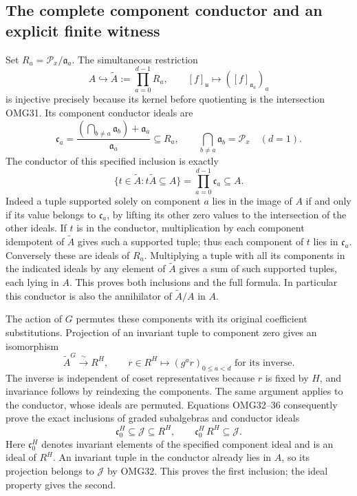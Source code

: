 \documentclass[11pt,a4paper]{article}
\begin{document}
\subsection{The complete component conductor and an explicit finite witness}
Set $R_a=\mathscr P_x/\mathfrak a_a$. The simultaneous restriction
\[
 A\hookrightarrow\widetilde A:=\prod_{a=0}^{d-1}R_a,
 \qquad[f]_{\mathfrak u}\longmapsto([f]_{\mathfrak a_a})_a
 \tag{OMG33}
\]
is injective precisely because its kernel before quotienting is the
intersection OMG31. Its component conductor ideals are
\[
 \mathfrak c_a=
 \frac{(\bigcap_{b\ne a}\mathfrak a_b)+\mathfrak a_a}{\mathfrak a_a}
       \subseteq R_a,
 \qquad\bigcap_{b\ne a}\mathfrak a_b=\mathscr P_x\quad(d=1).
 \tag{OMG34}
\]
The conductor of this specified inclusion is exactly
\[
 \boxed{\{t\in\widetilde A:t\widetilde A\subseteq A\}
                   =\prod_{a=0}^{d-1}\mathfrak c_a\subseteq A.}
 \tag{OMG35}
\]
Indeed a tuple supported solely on component $a$ lies in the image
of $A$ if and only if its value belongs to $\mathfrak c_a$, by
lifting its other zero values to the intersection of the other
ideals. If $t$ is in the conductor, multiplication by each component
idempotent of $\widetilde A$ gives such a supported tuple; thus each
component of $t$ lies in $\mathfrak c_a$. Conversely these are
ideals of $R_a$. Multiplying a tuple with all its components in
the indicated ideals by any element of $\widetilde A$ gives a sum
of such supported tuples, each lying in $A$. This proves both
inclusions and the full formula. In particular this conductor is
also the annihilator of $\widetilde A/A$ in $A$.

The action of $G$ permutes these components with its original
coefficient substitutions. Projection of an invariant tuple to
component zero gives an isomorphism
\[
 \widetilde A^G\xrightarrow{\ \sim\ }R^H,\qquad
 r\in R^H\longmapsto(g^a r)_{0\le a<d}
                       \text{ for its inverse}.
 \tag{OMG36}
\]
The inverse is independent of coset representatives because $r$
is fixed by $H$, and invariance follows by reindexing the components.
The same argument applies to the conductor, whose ideals are
permuted. Equations OMG32--36 consequently prove the exact
inclusions of graded subalgebras and conductor ideals
\[
 \boxed{\mathfrak c_0^H\subseteq\mathscr J\subseteq R^H,
            \qquad\mathfrak c_0^H\,R^H\subseteq\mathscr J.}
 \tag{OMG37}
\]
Here $\mathfrak c_0^H$ denotes invariant elements of the specified
component ideal and is an ideal of $R^H$. An invariant tuple in
the conductor already lies in $A$, so its projection belongs to
$\mathscr J$ by OMG32. This proves the first inclusion; the
ideal property gives the second.
\end{document}
